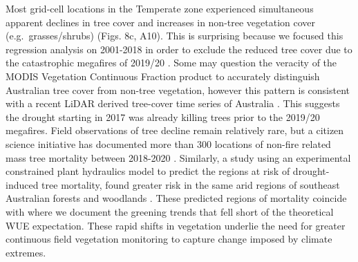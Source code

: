 \documentclass[gc, manuscript]{copernicus}
\begin{document}
Most grid-cell locations in the Temperate zone experienced simultaneous
apparent declines in tree cover and increases in non-tree vegetation
cover (e.g.~grasses/shrubs) (Figs. 8c, A10). This is surprising because
we focused this regression analysis on 2001-2018 in order to exclude the
reduced tree cover due to the catastrophic megafires of 2019/20
\citep{nolanCausesConsequencesEastern2020}. Some may question the
veracity of the MODIS Vegetation Continuous Fraction product
\citep{dimiceliMOD44BMODISTerra2017} to accurately distinguish
Australian tree cover from non-tree vegetation, however this pattern is
consistent with a recent LiDAR derived tree-cover time series of
Australia \citep{liaoWoodyVegetationCover2020}. This suggests the
drought starting in 2017 was already killing trees prior to the 2019/20
megafires. Field observations of tree decline remain relatively rare,
but a citizen science initiative has documented more than 300 locations
of non-fire related mass tree mortality between 2018-2020
\citep{atlasoflivingaustraliaDeadTreeDetective}. Similarly, a study
using an experimental constrained plant hydraulics model to predict the
regions at risk of drought-induced tree mortality, found greater risk in
the same arid regions of southeast Australian forests and woodlands
\citep{dekauweIdentifyingAreasRisk2020b}. These predicted regions of
mortality coincide with where we document the greening trends that fell
short of the theoretical WUE expectation. These rapid shifts in
vegetation underlie the need for greater continuous field vegetation
monitoring to capture change imposed by climate extremes.
\end{document}
